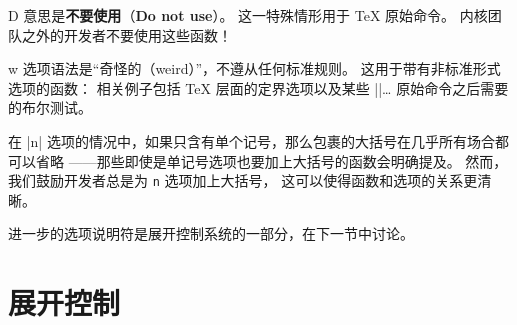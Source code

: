 \documentclass[full]{l3doc}
\newenvironment{arg-description}{%
\begin{itemize}\def\makelabel##1{\hss\llap{\bfseries##1}}}{\end{itemize}}
\begin{document}
\begin{arg-description}
    \item[D] 意思是\textbf{不要使用}（\textbf{Do not use}）。
    这一特殊情形用于 \TeX{} 原始命令。
    内核团队之外的开发者不要使用这些函数！
    \item[w] 选项语法是“奇怪的（weird）”，不遵从任何标准规则。
    这用于带有非标准形式选项的函数：
    相关例子包括 \TeX{} 层面的定界选项以及某些 |\if|\ldots{} 原始命令之后需要的布尔测试。
\end{arg-description}

%
在 |n| 选项的情况中，如果只含有单个记号，那么包裹的大括号在几乎所有场合都可以省略
——那些即使是单记号选项也要加上大括号的函数会明确提及。
然而，我们鼓励开发者总是为 \texttt{n} 选项加上大括号，
这可以使得函数和选项的关系更清晰。

%
进一步的选项说明符是展开控制系统的一部分，在下一节中讨论。

%
\section{展开控制}
\end{document}

